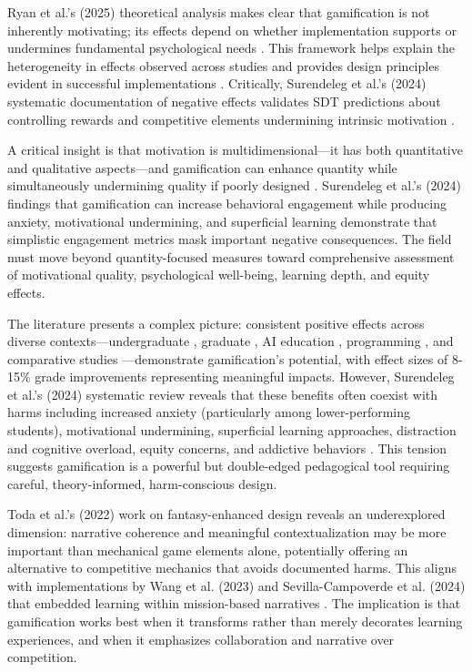 \documentclass[12pt,a4paper]{article}
\begin{document}
Ryan et al.'s (2025) theoretical analysis makes clear that gamification is not inherently motivating; its effects depend on whether implementation supports or undermines fundamental psychological needs \parencite{ryan2025}. This framework helps explain the heterogeneity in effects observed across studies \parencite{wu2024,dahri2024,ojonuba2023} and provides design principles evident in successful implementations \parencite{rodriguez2025,toda2022,sevilla2024}. Critically, Surendeleg et al.'s (2024) systematic documentation of negative effects \parencite{surendeleg2024} validates SDT predictions about controlling rewards and competitive elements undermining intrinsic motivation \parencite{ryan2025}.

A critical insight is that motivation is multidimensional—it has both quantitative and qualitative aspects—and gamification can enhance quantity while simultaneously undermining quality if poorly designed \parencite{ryan2025,surendeleg2024}. Surendeleg et al.'s (2024) findings that gamification can increase behavioral engagement while producing anxiety, motivational undermining, and superficial learning \parencite{surendeleg2024} demonstrate that simplistic engagement metrics mask important negative consequences. The field must move beyond quantity-focused measures toward comprehensive assessment of motivational quality, psychological well-being, learning depth, and equity effects.

The literature presents a complex picture: consistent positive effects across diverse contexts—undergraduate \parencite{rodriguez2025}, graduate \parencite{sevilla2024}, AI education \parencite{dahri2024}, programming \parencite{toda2022,wang2023}, and comparative studies \parencite{ojonuba2023}—demonstrate gamification's potential, with effect sizes of 8-15\% grade improvements representing meaningful impacts. However, Surendeleg et al.'s (2024) systematic review reveals that these benefits often coexist with harms including increased anxiety (particularly among lower-performing students), motivational undermining, superficial learning approaches, distraction and cognitive overload, equity concerns, and addictive behaviors \parencite{surendeleg2024}. This tension suggests gamification is a powerful but double-edged pedagogical tool requiring careful, theory-informed, harm-conscious design.

Toda et al.'s (2022) work on fantasy-enhanced design \parencite{toda2022} reveals an underexplored dimension: narrative coherence and meaningful contextualization may be more important than mechanical game elements alone, potentially offering an alternative to competitive mechanics that avoids documented harms. This aligns with implementations by Wang et al. (2023) and Sevilla-Campoverde et al. (2024) that embedded learning within mission-based narratives \parencite{wang2023,sevilla2024}. The implication is that gamification works best when it transforms rather than merely decorates learning experiences, and when it emphasizes collaboration and narrative over competition.
\end{document}
